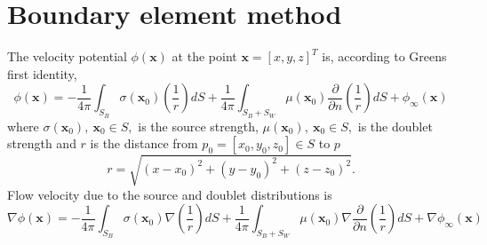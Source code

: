 \documentclass[]{book}
\newcommand{\V}[1]{\boldsymbol{#1}}
\begin{document}
\chapter{Boundary element method}
The velocity potential $\phi(\V{x})$ at the point $\V{x} = \left[x,y,z\right]^T$ is, according to Greens first identity, 
\begin{equation}
	\phi(\V{x}) = 
	- \frac{1}{4 \pi} \int_{S_B} \sigma (\V{x}_0) \left(\frac{1}{r} \right) dS
	+ \frac{1}{4 \pi} \int_{S_B + S_W} \mu(\V{x}_0)  \frac{\partial }{\partial n} \left( \frac{1}{r}\right) dS	
+ \phi_{\infty}(\V{x})
\label{eqGreen}
\end{equation}
where $\sigma(\V{x}_0),~ \V{x}_0 \in S,$ is the source strength, $\mu(\V{x}_0),~ \V{x}_0 \in S,$ is the doublet strength and $r$ is the distance from $p_0 = \left[x_0,y_0,z_0\right] \in S$ to $p$
\begin{equation}
r = \sqrt{(x-x_0)^2 + (y-y_0)^2 + (z-z_0)^2}.
\end{equation}
Flow velocity due to the source and doublet distributions is
\begin{equation}
\nabla \phi(\V{x}) = 
- \frac{1}{4 \pi} \int_{S_B} \sigma (\V{x}_0) \nabla\left(\frac{1}{r} \right) dS
+ \frac{1}{4 \pi} \int_{S_B + S_W} \mu(\V{x}_0) \nabla \frac{\partial }{\partial n} \left( \frac{1}{r}\right) dS	
+ \nabla \phi_{\infty}(\V{x})
\label{eqGreen}
\end{equation}
\end{document}
